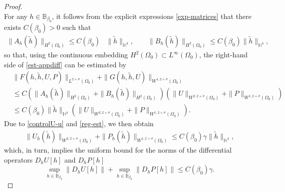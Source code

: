 \documentclass[10pt,a4paper]{amsart}
\begin{document}
\begin{proof}
\begin{equation}
\end{equation}
For any $h\in \mathbb{B}_{\beta_0}$, it follows from the explicit expressions \eqref{exp-matrices} that there exists $C(\beta_0)>0$ such that
\begin{equation*}\begin{aligned}
    \|A_h(\tilde{h})\|_{H^2(\Omega_0)}\leq C(\beta_0)&\|\tilde{h}\|_{\mathbb{H}^4}, \qquad   \|B_h(\tilde{h})\|_{H^2(\Omega_0)}\leq C(\beta_0)\|\tilde{h}\|_{\mathbb{H}^4},
    \end{aligned}
\end{equation*} so that, using the continuous embedding $H^2(\Omega_0)\subset L^\infty(\Omega_0)$, the right-hand side of \eqref{est-appdiff} can be estimated by
\begin{equation}\label{est-sources-dif}
    \begin{aligned}
        &\|F(h, \tilde{h}, U, P)\|_{L^{2+\sigma} (\Omega_0)} + \|G(h, \tilde{h}, U)\|_{W^{1,2+\sigma} (\Omega_0)}\\[5pt]&\leq C\left(\|A_h(\tilde{h})\|_{H^2(\Omega_0)}+\|B_h(\tilde{h})\|_{H^2(\Omega_0)}\right)\left( \| U\|_{W^{2, 2+\sigma}(\Omega_0)} + \| P\|_{W^{1, 2+\sigma}(\Omega_0) } \right)
     \\[5pt]&  \leq  C(\beta_0)\|\tilde{h}\|_{\mathbb{H}^4}\left(\| U\|_{W^{2, 2+\sigma}(\Omega_0)} + \| P\|_{W^{1, 2+\sigma}(\Omega_0)} \right).
    \end{aligned}
\end{equation}
Due to \eqref{controlU-u} and \eqref{reg-est}, we then obtain
\begin{equation*}
    \begin{aligned}
    \|U_h(\tilde{h})\|_{W^{2, 2+\sigma}(\Omega_0)} + \|P_h(\tilde{h})\|_{W^{1, 2+\sigma}(\Omega_0)} \leq C(\beta_0)\gamma  \|\tilde{h}\|_{\mathbb{H}^4},
    \end{aligned}
\end{equation*}which, in turn, implies the uniform bound for the norms of the differential operators $D_hU[h]$ and $D_hP[h]$
\begin{equation}\label{uni-bou-diff}
    \sup_{h\in \mathbb{B}_{\beta_0}} \|D_hU[h]\| +  \sup_{h\in \mathbb{B}_{\beta_0}} \|D_hP[h]\| \leq C(\beta_0)\gamma.
\end{equation}


\end{proof}
\end{document}
